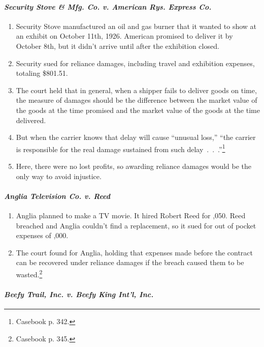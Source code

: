 \paragraph{\emph{Security Stove \& Mfg. Co. v. American Rys. Express Co.}}

\begin{enumerate}
    \item Security Stove manufactured an oil and gas burner that it wanted to 
    show at an exhibit on October 11th, 1926. American promised to deliver it by 
    October 8th, but it didn't arrive until after the exhibition closed.
    \item Security sued for reliance damages, including travel and exhibition 
    expenses, totaling \$801.51.
    \item The court held that in general, when a shipper fails to deliver 
    goods on time, the measure of damages should be the difference between the 
    market value of the goods at the time promised and the market value of the 
    goods at the time delivered.
    \item But when the carrier knows that delay will cause ``unusual loss,'' 
    ``the carrier is responsible for the real damage sustained from such 
    delay~.~.~.''\footnote{Casebook p. 342.}
    \item Here, there were no lost profits, so awarding reliance damages would 
    be the only way to avoid injustice.
\end{enumerate}

\paragraph{\emph{Anglia Television Co. v. Reed}}

\begin{enumerate}
    \item Anglia planned to make a TV movie. It hired Robert Reed for 
    ,050. Reed breached and Anglia couldn't find a replacement, 
    so it sued for out of pocket expenses of ,000.
    \item The court found for Anglia, holding that expenses made before the 
    contract can be recovered under reliance damages if the breach caused them 
    to be wasted.\footnote{Casebook p. 345.}
\end{enumerate}

\paragraph{\emph{Beefy Trail, Inc. v. Beefy King Int'l, Inc.}}

